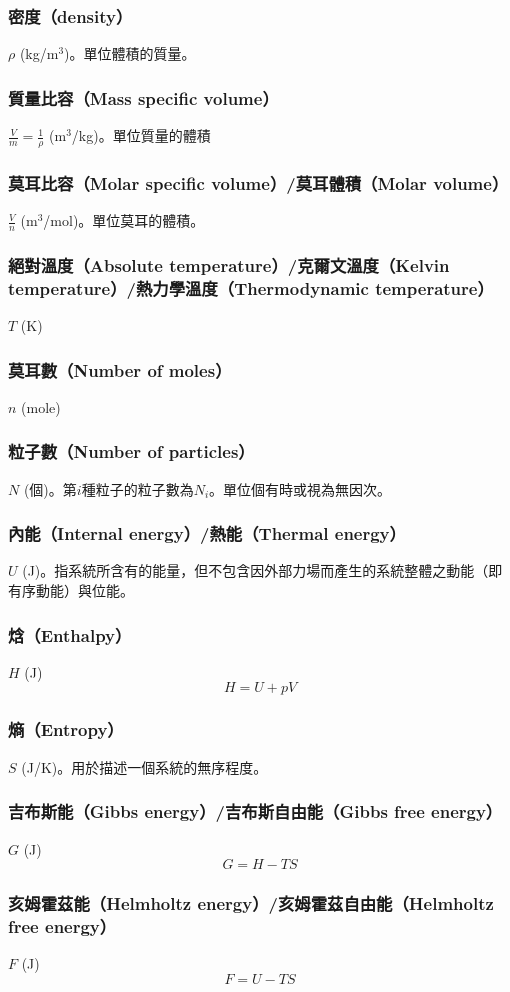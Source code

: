 \documentclass[a4paper,12pt]{report}
\begin{document}
\subsubsection{密度（density）}
\(\rho\) (kg/m\(^3\))。單位體積的質量。
\subsubsection{質量比容（Mass specific volume）}
$\frac{V}{m}=\frac{1}{\rho}$ (m$^3$/kg)。單位質量的體積
\subsubsection{莫耳比容（Molar specific volume）/莫耳體積（Molar volume）}
$\frac{V}{n}$ (m$^3$/mol)。單位莫耳的體積。
\subsubsection{絕對溫度（Absolute temperature）/克爾文溫度（Kelvin temperature）/熱力學溫度（Thermodynamic temperature）}
$T$ (K)
\subsubsection{莫耳數（Number of moles）}
$n$ (mole)
\subsubsection{粒子數（Number of particles）}
$N$ (個)。第$i$種粒子的粒子數為$N_i$。單位個有時或視為無因次。
\subsubsection{內能（Internal energy）/熱能（Thermal energy）}
$U$ (J)。指系統所含有的能量，但不包含因外部力場而產生的系統整體之動能（即有序動能）與位能。
\subsubsection{焓（Enthalpy）}
$H$ (J)
\[H = U + pV\]
\subsubsection{熵（Entropy）}
$S$ (J/K)。用於描述一個系統的無序程度。
\subsubsection{吉布斯能（Gibbs energy）/吉布斯自由能（Gibbs free energy）}
$G$ (J)
\[G = H - TS\]
\subsubsection{亥姆霍茲能（Helmholtz energy）/亥姆霍茲自由能（Helmholtz free energy）}
$F$ (J)
\[F = U - TS\]
\end{document}
